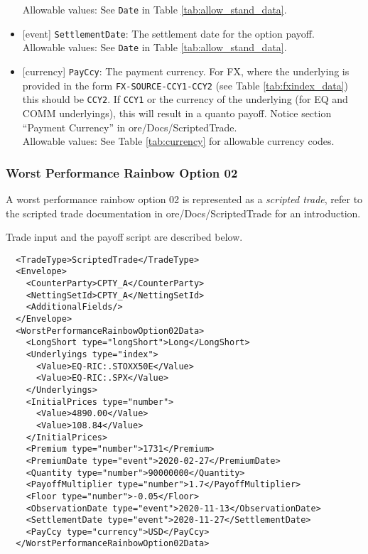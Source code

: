 \begin{itemize}
  Allowable values: See \lstinline!Date! in Table \ref{tab:allow_stand_data}.
  \item{}[event] \lstinline!SettlementDate!: The settlement date for the option payoff. \\
  Allowable values: See \lstinline!Date! in Table \ref{tab:allow_stand_data}.
  \item{}[currency] \lstinline!PayCcy!: The payment currency. For FX, where the underlying is provided
      in the form \lstinline!FX-SOURCE-CCY1-CCY2! (see Table \ref{tab:fxindex_data}) this should
      be \lstinline!CCY2!. If \lstinline!CCY1! or the currency of the underlying (for EQ and
      COMM underlyings), this will result in a quanto payoff. Notice section ``Payment Currency'' in ore/Docs/ScriptedTrade. \\
        Allowable values: See Table \ref{tab:currency} for allowable currency codes.
\end{itemize}

\subsubsection*{Worst Performance Rainbow Option 02}

A worst performance rainbow option 02 is represented as a {\em scripted trade},
refer to the scripted trade documentation in ore/Docs/ScriptedTrade
for an introduction.

Trade input and the payoff script are described below.

\begin{verbatim}
  <TradeType>ScriptedTrade</TradeType>
  <Envelope>
    <CounterParty>CPTY_A</CounterParty>
    <NettingSetId>CPTY_A</NettingSetId>
    <AdditionalFields/>
  </Envelope>
  <WorstPerformanceRainbowOption02Data>
    <LongShort type="longShort">Long</LongShort>
    <Underlyings type="index">
      <Value>EQ-RIC:.STOXX50E</Value>
      <Value>EQ-RIC:.SPX</Value>
    </Underlyings>
    <InitialPrices type="number">
      <Value>4890.00</Value>
      <Value>108.84</Value>
    </InitialPrices>
    <Premium type="number">1731</Premium>
    <PremiumDate type="event">2020-02-27</PremiumDate>
    <Quantity type="number">90000000</Quantity>
    <PayoffMultiplier type="number">1.7</PayoffMultiplier>
    <Floor type="number">-0.05</Floor>
    <ObservationDate type="event">2020-11-13</ObservationDate>
    <SettlementDate type="event">2020-11-27</SettlementDate>
    <PayCcy type="currency">USD</PayCcy>
  </WorstPerformanceRainbowOption02Data>
\end{verbatim}

